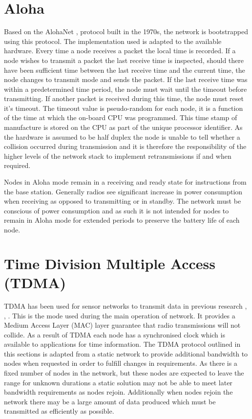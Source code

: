 \documentclass[parskip]{cs4rep}
\begin{document}
\section{Aloha}

Based on the AlohaNet \cite{PR4}, \cite{PR5} protocol built in the 1970s, the network is bootstrapped using this protocol. The implementation used is adapted to the available hardware. Every time a node receives a packet the local time is recorded. If a node wishes to transmit a packet the last receive time is inspected, should there have been sufficient time between the last receive time and the current time, the node changes to transmit mode and sends the packet. If the last receive time was within a predetermined time period, the node must wait until the timeout before transmitting. If another packet is received during this time, the node must reset it’s timeout. The timeout value is pseudo-random for each node, it is a function of the time at which the on-board CPU was programmed. This time stamp of manufacture is stored on the CPU as part of the unique processor identifier. As the hardware is assumed to be half duplex the node is unable to tell whether a collision occurred during transmission and it is therefore the responsibility of the higher levels of the network stack to implement retransmissions if and when required.

Nodes in Aloha mode remain in a receiving and ready state for instructions from the base station. Generally radios see significant increase in power consumption when receiving as opposed to transmitting or in standby. The network must be conscious of power consumption and as such it is not intended for nodes to remain in Aloha mode for extended periods to preserve the battery life of each node.

\section{Time Division Multiple Access (TDMA)}

TDMA has been used for sensor networks to transmit data in previous research \cite{PR3}, \cite{RFC1}, \cite{RFC2}. This is the mode used during the main operation of network. It provides a Medium Access Layer (MAC) layer guarantee that radio transmissions will not collide. As a result of TDMA each node has a synchronised clock which is available to applications for time information. The TDMA protocol outlined in this sections is adapted from a static network to provide additional bandwidth to nodes when requested in order to fulfill changes in requirements. As there is a fixed number of nodes in the network, but these nodes are expected to leave the range for unknown durations a static solution may not be able to meet later bandwidth requirements as nodes rejoin. Additionally when nodes rejoin the network there may be a large amount of data produced which must be transmitted as efficiently as possible.
\end{document}
